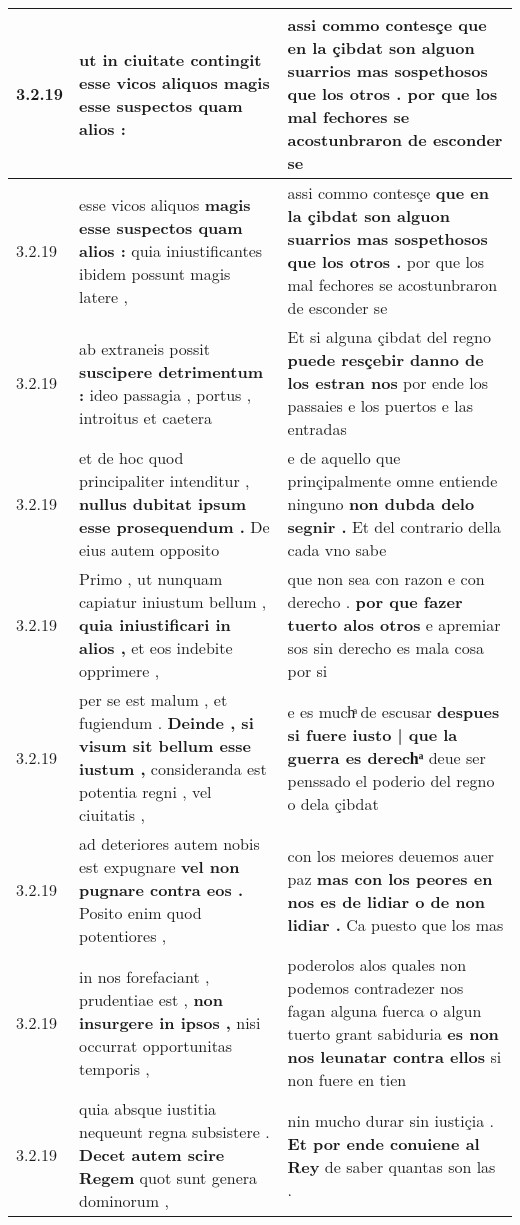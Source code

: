 \begin{tabular}{|p{1cm}|p{6.5cm}|p{6.5cm}|}
3.2.19 & ut in ciuitate contingit \textbf{ esse vicos aliquos } magis esse suspectos quam alios : & assi commo contesçe \textbf{ que en la çibdat son alguon suarrios mas sospethosos que los otros . } por que los mal fechores se acostunbraron de esconder se \\\hline
3.2.19 & esse vicos aliquos \textbf{ magis esse suspectos quam alios : } quia iniustificantes ibidem possunt magis latere , & assi commo contesçe \textbf{ que en la çibdat son alguon suarrios mas sospethosos que los otros . } por que los mal fechores se acostunbraron de esconder se \\\hline
3.2.19 & ab extraneis possit \textbf{ suscipere detrimentum : } ideo passagia , portus , introitus et caetera & Et si alguna çibdat del regno \textbf{ puede resçebir danno de los estran nos } por ende los passaies e los puertos e las entradas \\\hline
3.2.19 & et de hoc quod principaliter intenditur , \textbf{ nullus dubitat ipsum esse prosequendum . } De eius autem opposito & e de aquello que prinçipalmente omne entiende ninguno \textbf{ non dubda delo segnir . } Et del contrario della cada vno sabe \\\hline
3.2.19 & Primo , ut nunquam capiatur iniustum bellum , \textbf{ quia iniustificari in alios , } et eos indebite opprimere , & que non sea con razon e con derecho . \textbf{ por que fazer tuerto alos otros } e apremiar sos sin derecho es mala cosa por si \\\hline
3.2.19 & per se est malum , et fugiendum . \textbf{ Deinde , si visum sit bellum esse iustum , } consideranda est potentia regni , vel ciuitatis , & e es muchͣ de escusar \textbf{ despues si fuere iusto | que la guerra es derechͣ } deue ser penssado el poderio del regno o dela çibdat \\\hline
3.2.19 & ad deteriores autem nobis est expugnare \textbf{ vel non pugnare contra eos . } Posito enim quod potentiores , & con los meiores deuemos auer paz \textbf{ mas con los peores en nos es de lidiar o de non lidiar . } Ca puesto que los mas \\\hline
3.2.19 & in nos forefaciant , prudentiae est , \textbf{ non insurgere in ipsos , } nisi occurrat opportunitas temporis , & poderolos alos quales non podemos contradezer nos fagan alguna fuerca o algun tuerto grant sabiduria \textbf{ es non nos leunatar contra ellos } si non fuere en tien \\\hline
3.2.19 & quia absque iustitia nequeunt regna subsistere . \textbf{ Decet autem scire Regem } quot sunt genera dominorum , & nin mucho durar sin iustiçia . \textbf{ Et por ende conuiene al Rey } de saber quantas son las . \\\hline

\end{tabular}
